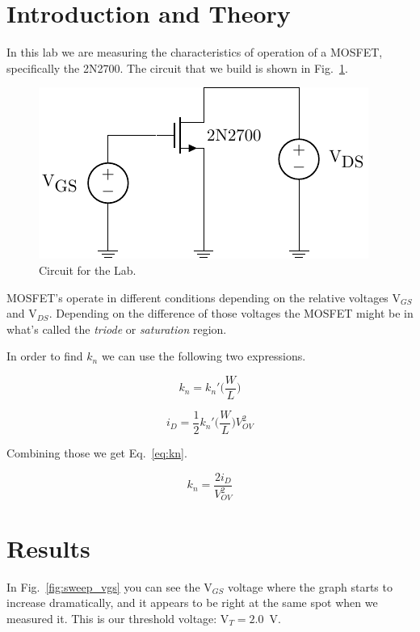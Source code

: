\documentclass{../../ece-report}
\begin{document}
\maketitle

\section{Introduction and Theory}

In this lab we are measuring the characteristics
of operation of a MOSFET, specifically the 2N2700. The circuit that we build
is shown in Fig.~\ref{fig:circuit}.

\begin{figure}[h!]
  \centering
  \includegraphics{circuits/circuit.pdf}
  \caption{Circuit for the Lab.}
  \label{fig:circuit}
\end{figure}

MOSFET's operate in different conditions depending on
the relative voltages V$_{GS}$ and V$_{DS}$. Depending
on the difference of those voltages the MOSFET might
be in what's called the \emph{triode} or \emph{saturation}
region.

In order to find $k_n$ we can use the following two expressions.

\[
  k_n = k_n'\Big( \frac{W}{L} \Big)
\]

\[
  i_D = \frac{1}{2} k_n'\Big( \frac{W}{L} \Big) V_{OV}^2
\]

Combining those we get Eq.~\ref{eq:kn}.

\begin{equation}
  k_n = \frac{2 i_D}{V_{OV}^2}
  \label{eq:kn}
\end{equation}

\section{Results}

In Fig.~\ref{fig:sweep_vgs}  you can see the V$_{GS}$
voltage where the graph starts to increase dramatically,
and it appears to be right at the same spot when we
measured it. This is our threshold voltage: V$_{T} =
2.0$~V.
\end{document}
